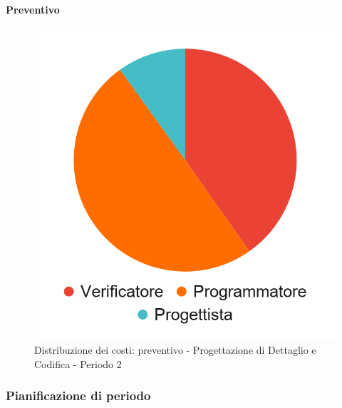 \planningTable{
	
}

\paragraph{Preventivo}
\subparagraph*{}

\hspace{-1cm}
\begin{minipage}{.50\textwidth}
\smallPreventivoTable{
	
}
\end{minipage}
\hspace{1cm}
\begin{minipage}{.40\textwidth}
\begin{figure}[H]
	\includegraphics[scale=0.21]{res/images/charts/preventivo_priori/Grafico4-7.png}
	\caption{Distribuzione dei costi: preventivo - Progettazione di Dettaglio e Codifica - Periodo 2}
\end{figure}
\end{minipage} 




\subsubsection{Pianificazione di periodo}

